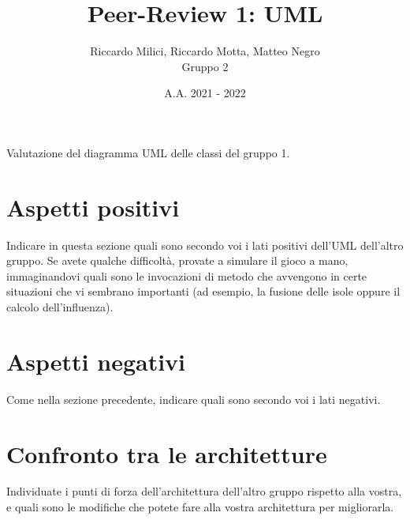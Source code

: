 \documentclass[a4paper]{article}
\title{\textbf{Peer-Review 1: UML}}
\author{Riccardo Milici, Riccardo Motta, Matteo Negro\\Gruppo 2}
\date{A.A. 2021 - 2022}
\begin{document}
	\maketitle
	
	Valutazione del diagramma UML delle classi del gruppo 1.
	
	\section{Aspetti positivi}
	
	Indicare in questa sezione quali sono secondo voi i lati positivi dell'UML dell'altro gruppo. Se avete qualche difficoltà, provate a simulare il gioco a mano, immaginandovi quali sono le invocazioni di metodo che avvengono in certe situazioni che vi sembrano importanti (ad esempio, la fusione delle isole oppure il calcolo dell'influenza).
	
	\section{Aspetti negativi}
	
	Come nella sezione precedente, indicare quali sono secondo voi i lati negativi.
	
	\section{Confronto tra le architetture}
	
	Individuate i punti di forza dell'architettura dell'altro gruppo rispetto alla vostra, e quali sono le modifiche che potete fare alla vostra architettura per migliorarla.
\end{document}
